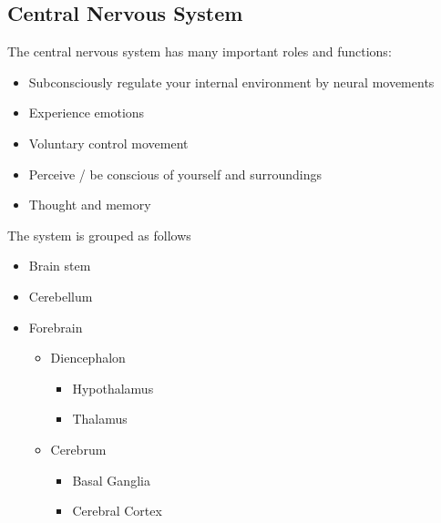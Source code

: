 \documentclass[11pt]{article}
\begin{document}
\subsection{Central Nervous System}
The central nervous system has many important roles and functions:
\begin{itemize}
\item  Subconsciously regulate your internal environment by neural movements
\item Experience emotions
\item Voluntary control movement
\item Perceive / be conscious of yourself and surroundings
\item Thought and memory
\end{itemize}
The system is grouped as follows 
\begin{itemize}
\item Brain stem
\item Cerebellum
\item Forebrain
\begin{itemize}
\item Diencephalon
\begin{itemize}
\item Hypothalamus
\item Thalamus
\end{itemize}
\item Cerebrum
\begin{itemize}
\item Basal Ganglia
\item Cerebral Cortex
\end{itemize}
\end{itemize}
\end{itemize}
\end{document}
